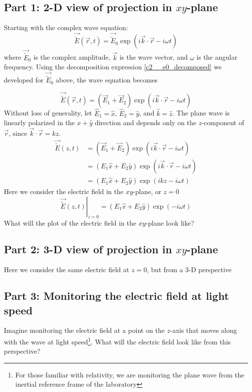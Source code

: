 \documentclass{article}
\begin{document}
\subsection{Part 1: 2-D view of projection in $xy$-plane}
Starting with the complex wave equation:
\begin{equation}
    \vec{\widetilde{E}}\left(\vec{r},t\right) = \vec{\widetilde{E}}_0 \exp \left(i \vec{k} \cdot \vec{r} - i \omega t\right)
\end{equation}
where $\vec{\widetilde{E}}_0$ is the complex amplitude, $\vec{k}$ is the wave vector, and $\omega$ is the angular frequency.  Using the decomposition expression \eqref{c2__e0_decomposed} we developed for $\vec{\widetilde{E}}_0$ above, the wave equation becomes

\begin{equation}
    \vec{\widetilde{E}}\left(\vec{r},t\right) = \left(\vec{E}_1 + \vec{E}_2\right) \exp \left(i \vec{k} \cdot \vec{r} - i \omega t\right)
\end{equation}
Without loss of generality, let $\hat{E}_1=\hat{x}$, $\hat{E}_2=\hat{y}$, and $\hat{k}=\hat{z}$.   The plane wave is linearly polarized in the $\hat{x}+\hat{y}$ direction and depends only on the $z$-component of $\vec r$, since $\vec{k} \cdot \vec{r} = kz$.
\begin{align}
     \vec{\widetilde{E}}\left(z,t\right) &= \left(\vec{E}_1 + \vec{E}_2\right) \exp \left(i \vec{k} \cdot \vec{r} - i \omega t\right)\\
     &= \left(E_1\hat{x} + E_2\hat{y}\right) \exp \left(i \vec{k} \cdot \vec{r} - i \omega t\right)\\
     &= \left(E_1\hat{x} + E_2\hat{y}\right) \exp \left(i kz - i \omega t\right) 
\end{align}
Here we consider the electric field in the $xy$-plane, or $z=0$
\begin{equation}
     \left.\vec{\widetilde{E}}\left(z,t\right)\right\rvert_{z=0} = \left(E_1\hat{x} + E_2\hat{y}\right) \exp \left(- i \omega t\right) 
\end{equation}
What will the plot of the electric field in the $xy$-plane look like?

\subsection{Part 2: 3-D view of projection in $xy$-plane}
Here we consider the same electric field at $z=0$, but from a 3-D perspective

\subsection{Part 3: Monitoring the electric field at light speed}
Imagine monitoring the electric field at a point on the $z$-axis that moves along with the wave at light speed\footnote{For those familiar with relativity, we are monitoring the plane wave from the inertial reference frame of the laboratory}.  What will the electric field look like from this perspective?
\end{document}
